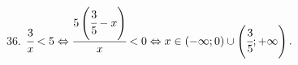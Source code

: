 36. $\cfrac{3}{x}<5\Leftrightarrow \cfrac{5\left(\cfrac{3}{5}-x\right)}{x}<0\Leftrightarrow x\in(-\infty;0)\cup\left(\cfrac{3}{5};+\infty\right).$\\
